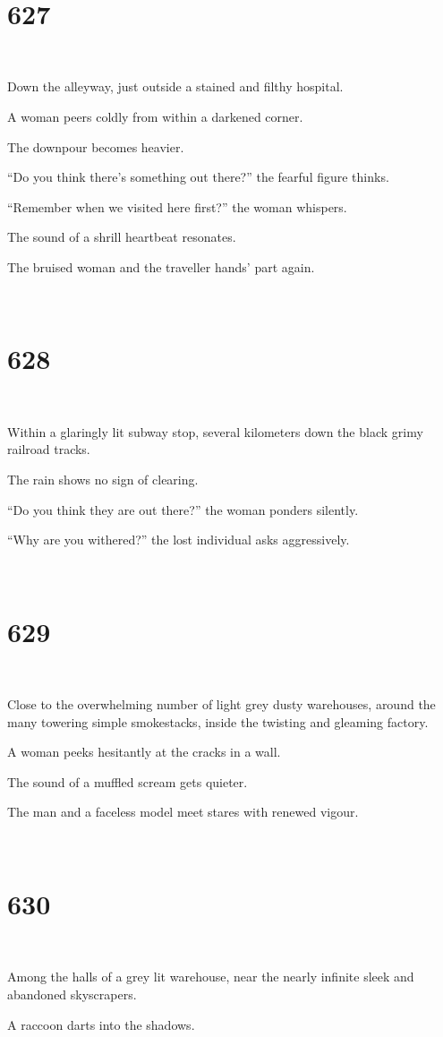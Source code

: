 \documentclass{report}
\begin{document}
~
\chapter*{627}
~

Down the alleyway, just outside a stained and filthy hospital.

A woman peers coldly from within a darkened corner.

The downpour becomes heavier.

``Do you think there's something out there?'' the fearful figure thinks.

``Remember when we visited here first?'' the woman whispers.

The sound of a shrill heartbeat resonates.

The bruised woman and the traveller hands' part again.

~
\chapter*{628}
~

Within a glaringly lit subway stop, several kilometers down the black grimy railroad tracks.

The rain shows no sign of clearing.

``Do you think they are out there?'' the woman ponders silently.

``Why are you withered?'' the lost individual asks aggressively.

~
\chapter*{629}
~

Close to the overwhelming number of light grey dusty warehouses, around the many towering simple smokestacks, inside the twisting and gleaming factory.

A woman peeks hesitantly at the cracks in a wall.

The sound of a muffled scream gets quieter.

The man and a faceless model meet stares with renewed vigour.

~
\chapter*{630}
~

Among the halls of a grey lit warehouse, near the nearly infinite sleek and abandoned skyscrapers.

A raccoon darts into the shadows.
\end{document}
